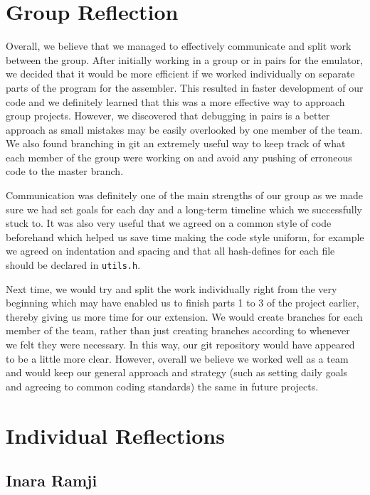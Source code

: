 \documentclass[11pt]{article}
\begin{document}
\section{Group Reflection}

Overall, we believe that we managed to effectively communicate and split work between the group. After initially working in a group or in pairs for the emulator, we decided that it would be more efficient if we worked individually on separate parts of the program for the assembler. This resulted in faster development of our code and we definitely learned that this was a more effective way to approach group projects. However, we discovered that debugging in pairs is a better approach as small mistakes may be easily overlooked by one member of the team. We also found branching in git an extremely useful way to keep track of what each member of the group were working on and avoid any pushing of erroneous code to the master branch.

Communication was definitely one of the main strengths of our group as we made sure we had set goals for each day and a long-term timeline which we successfully stuck to. It was also very useful that we agreed on a common style of code beforehand which helped us save time making the code style uniform, for example we agreed on indentation and spacing and that all hash-defines for each file should be declared in \texttt{utils.h}.

Next time, we would try and split the work individually right from the very beginning which may have enabled us to finish parts 1 to 3 of the project earlier, thereby giving us more time for our extension. We would create branches for each member of the team, rather than just creating branches according to whenever we felt they were necessary. In this way, our git repository would have appeared to be a little more clear. However, overall we believe we worked well as a team and would keep our general approach and strategy (such as setting daily goals and agreeing to common coding standards) the same in future projects.

\section{Individual Reflections}

\subsection{Inara Ramji}
\end{document}
